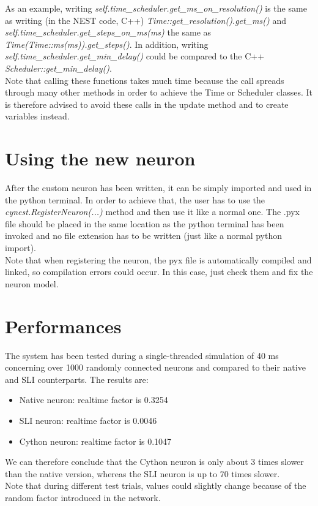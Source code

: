 \documentclass{article}
\begin{document}
As an example, writing \emph{self.time\_scheduler.get\_ms\_on\_resolution()} is the same as writing (in the NEST code, C++) \emph{Time::get\_resolution().get\_ms()} and \\ \emph{self.time\_scheduler.get\_steps\_on\_ms(ms)} the same as \emph{Time(Time::ms(ms)).get\_steps()}. In addition, writing \emph{self.time\_scheduler.get\_min\_delay()} could be compared to the C++ \emph{Scheduler::get\_min\_delay()}.\\
Note that calling these functions takes much time because the call spreads through many other methods in order to achieve the Time or Scheduler classes. It is therefore advised to avoid these calls in the update method and to create variables instead.

\section{Using the new neuron}
After the custom neuron has been written, it can be simply imported and used in the python terminal. In order to achieve that, the user has to use the \emph{cynest.RegisterNeuron(...)} method and then use it like a normal one. The .pyx file should be placed in the same location as the python terminal has been invoked and no file extension has to be written (just like a normal python import).\\
Note that when registering the neuron, the pyx file is automatically compiled and linked, so compilation errors could occur. In this case, just check them and fix the neuron model.

\section{Performances}
The system has been tested during a single-threaded simulation of 40 ms concerning over 1000 randomly connected neurons and compared to their native and SLI counterparts. The results are:
\begin{itemize}
\item Native neuron: realtime factor is 0.3254
\item SLI neuron: realtime factor is 0.0046
\item Cython neuron: realtime factor is 0.1047
\end{itemize}
We can therefore conclude that the Cython neuron is only about 3 times slower than the native version, whereas the SLI neuron is up to 70 times slower.\\
Note that during different test trials, values could slightly change because of the random factor introduced in the network.\\
\end{document}
